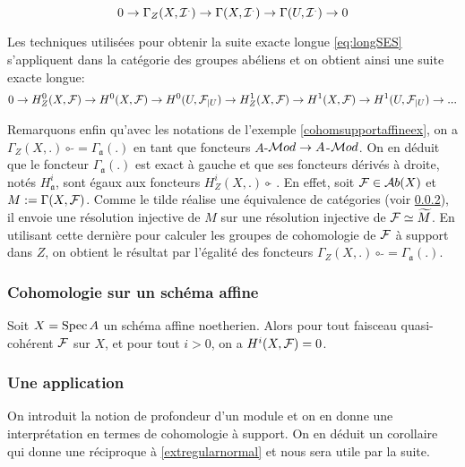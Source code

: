 $$0\rightarrow \Gamma_Z(X,\mathcal{I}^.)\rightarrow \Gamma(X,\mathcal{I}^.)\rightarrow \Gamma(U,\mathcal{I}^.)\rightarrow 0$$

Les techniques utilisées pour obtenir la suite exacte longue \ref{eq:longSES} s'appliquent dans la catégorie des groupes abéliens et on obtient ainsi une suite exacte longue:
\begin{equation}\label{eq:longSESSupport}
0\rightarrow H_Z^0(X,\mathcal{F})\rightarrow H^0(X,\mathcal{F})\rightarrow H^0(U,\mathcal{F}_{|U})\rightarrow  H_Z^1(X,\mathcal{F})\rightarrow H^1(X,\mathcal{F})\rightarrow H^1(U,\mathcal{F}_{|U})\rightarrow ...
\end{equation}


Remarquons enfin qu'avec les notations de l'exemple \ref{cohomsupportaffineex}, on a $\Gamma_Z(X, .)\circ\, \widetilde{}=\Gamma_\mathfrak{a}(.)$ en tant que foncteurs $A$-$\mathcal{M} od\rightarrow A$-$\mathcal{M} od$. On en déduit que le foncteur $\Gamma_\mathfrak{a}(.)$ est exact à gauche et que ses foncteurs dérivés à droite, notés $H_\mathfrak{a}^i$, sont égaux aux foncteurs $H_Z^i(X,.)\circ \widetilde{}$ . En effet, soit $\mathcal{F} \in \mathcal{A} b(X)$ et $M:=\Gamma(X,\mathcal{F})$. Comme le tilde réalise une équivalence de catégories (voir \ref{}), il envoie une résolution injective de $M$ sur une résolution injective de $\mathcal{F}\simeq \widetilde{M}$. En utilisant cette dernière pour calculer les groupes de cohomologie de $\mathcal{F}$ à support dans $Z$, on obtient le résultat par l'égalité des foncteurs $\Gamma_Z(X, .)\circ\, \widetilde{}=\Gamma_\mathfrak{a}(.)$.

\subsubsection{Cohomologie sur un schéma affine}

\begin{thm}\label{cohomoaffine}
Soit $X=\operatorname{Spec} A$ un schéma affine noetherien. Alors pour tout faisceau quasi-cohérent $\mathcal{F}$ sur $X$, et pour tout $i>0$, on a $H^i(X,\mathcal{F})=0$. 
\end{thm}

\subsubsection{Une application}

On introduit la notion de profondeur d'un module et on en donne une interprétation en termes de cohomologie à support. On en déduit un corollaire qui donne une réciproque à \ref{extregularnormal} et nous sera utile par la suite.

